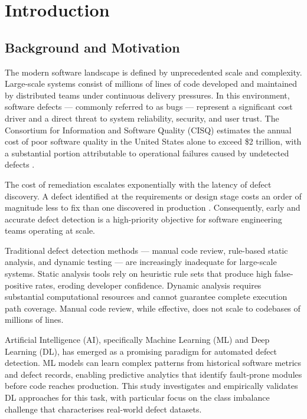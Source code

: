 \documentclass[12pt,a4paper,oneside]{report}
\begin{document}
\chapter{Introduction}

\section{Background and Motivation}

The modern software landscape is defined by unprecedented scale and complexity. Large-scale systems consist of millions of lines of code developed and maintained by distributed teams under continuous delivery pressures. In this environment, software defects --- commonly referred to as bugs --- represent a significant cost driver and a direct threat to system reliability, security, and user trust. The Consortium for Information and Software Quality (CISQ) estimates the annual cost of poor software quality in the United States alone to exceed \$2 trillion, with a substantial portion attributable to operational failures caused by undetected defects \citep{cisq2022}.

The cost of remediation escalates exponentially with the latency of defect discovery. A defect identified at the requirements or design stage costs an order of magnitude less to fix than one discovered in production \citep{boehm1981}. Consequently, early and accurate defect detection is a high-priority objective for software engineering teams operating at scale.

Traditional defect detection methods --- manual code review, rule-based static analysis, and dynamic testing --- are increasingly inadequate for large-scale systems. Static analysis tools rely on heuristic rule sets that produce high false-positive rates, eroding developer confidence. Dynamic analysis requires substantial computational resources and cannot guarantee complete execution path coverage. Manual code review, while effective, does not scale to codebases of millions of lines.

Artificial Intelligence (AI), specifically Machine Learning (ML) and Deep Learning (DL), has emerged as a promising paradigm for automated defect detection. ML models can learn complex patterns from historical software metrics and defect records, enabling predictive analytics that identify fault-prone modules before code reaches production. This study investigates and empirically validates DL approaches for this task, with particular focus on the class imbalance challenge that characterises real-world defect datasets.
\end{document}
